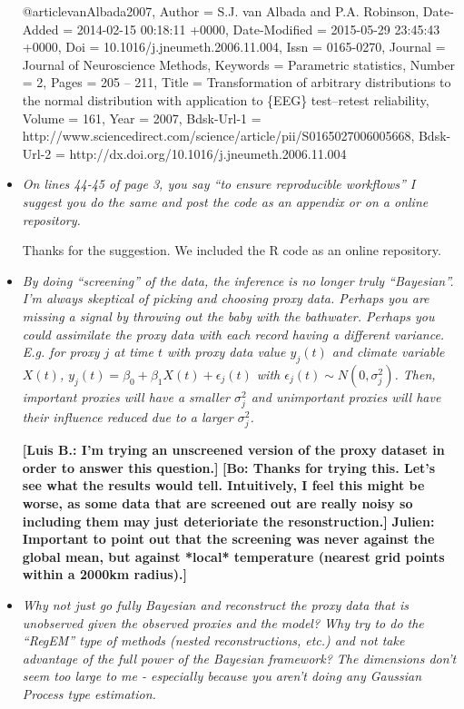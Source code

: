 \documentclass[11pt]{article}
\newcommand{\lb}[1]{\color{ForestGreen}\textbf{[Luis B.: #1]}\normalcolor}
\newcommand{\bl}[1]{\color{red}\textbf{[Bo: #1]}\normalcolor}
\newcommand{\jeg}[1]{\color{blue}\textbf{Julien: #1]}\normalcolor}
\begin{document}
\begin{itemize}
  @article{vanAlbada2007,
	Author = {S.J. van Albada and P.A. Robinson},
	Date-Added = {2014-02-15 00:18:11 +0000},
	Date-Modified = {2015-05-29 23:45:43 +0000},
	Doi = {10.1016/j.jneumeth.2006.11.004},
	Issn = {0165-0270},
	Journal = {Journal of Neuroscience Methods},
	Keywords = {Parametric statistics},
	Number = {2},
	Pages = {205 -- 211},
	Title = {Transformation of arbitrary distributions to the normal distribution with application to \{EEG\} test--retest reliability},
	Volume = {161},
	Year = {2007},
	Bdsk-Url-1 = {http://www.sciencedirect.com/science/article/pii/S0165027006005668},
	Bdsk-Url-2 = {http://dx.doi.org/10.1016/j.jneumeth.2006.11.004}}



  
\item \textit{On lines 44-45 of page 3, you say “to ensure reproducible
    workflows” I suggest you do the same and post the code as an appendix or on
    a online repository.}

  Thanks for the suggestion. We included the R code as an online repository.

  
\item \textit{By doing “screening” of the data, the inference is no longer truly
    “Bayesian”. I'm always skeptical of picking and choosing proxy data. Perhaps
    you are missing a signal by throwing out the baby with the bathwater.
    Perhaps you could assimilate the proxy data with each record having a
    different variance. E.g. for proxy $j$ at time $t$ with proxy data value $y_j(t)$ and climate variable $X(t)$, $y_j(t)=\beta_0+\beta_1X(t)+\epsilon_j(t)$
with $\epsilon_j(t)\sim N(0,\sigma_j^2)$. Then, important proxies will have a
smaller $\sigma_j^2$ and unimportant proxies will have their influence reduced due to a larger $\sigma_j^2$.
}

\lb{I'm trying an unscreened version of the proxy dataset in order to answer
  this question.}
\bl{Thanks for trying this. Let's see what the results would tell. Intuitively, I feel this might be worse, as some data that are screened out are really noisy so including them may just deterioriate the resonstruction.}
\jeg{Important to point out that the screening was never against the global mean, but against *local* temperature (nearest grid points within a 2000km radius).}

\item \textit{Why not just go fully Bayesian and reconstruct the proxy data that
    is unobserved given the observed proxies and the model? Why try to do the
    ``RegEM'' type of methods (nested reconstructions, etc.) and not take
    advantage of the full power of the Bayesian framework? The dimensions don't
    seem too large to me - especially because you aren't doing any Gaussian
    Process type estimation.
}


\end{itemize}
\end{document}
